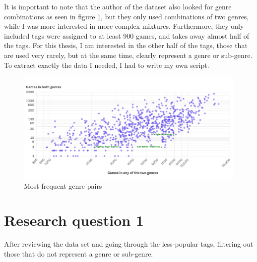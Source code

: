 It is important to note that the author of the dataset also looked for genre combinations as seen in figure \ref{figure:genre-pairs}, but they only used combinations of two genres, while I was more interested in more complex mixtures. Furthermore, they only included tags were assigned to at least 900 games, and takes away almost half of the tags. For this thesis, I am interested in the other half of the tags, those that are used very rarely, but at the same time, clearly represent a genre or sub-genre. To extract exactly the data I needed, I had to write my own script.

\begin{figure}[h]
    \centering
    \includegraphics[width=\textwidth]{images/genre-pairs.png}
    \caption{Most frequent genre pairs}
    \label{figure:genre-pairs}
\end{figure}

\section{Research question 1}

After reviewing the data set and going through the less-popular tags, filtering out those that do not represent a genre or sub-genre.

